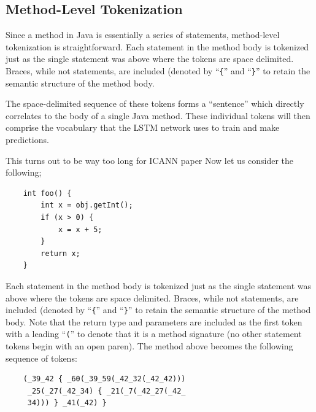 \documentclass[runningheads,a4paper]{llncs}
\begin{document}
\subsection{Method-Level Tokenization}

Since a method in Java is essentially a series of statements, method-level
tokenization is straightforward.
Each statement in the method body is tokenized just as the single statement 
was above where the tokens are space delimited. Braces, while not 
statements, are included (denoted by ``\texttt\{'' and
``\texttt\}''  to retain the semantic structure of the method body. 

The space-delimited sequence of these tokens forms a ``sentence'' which  
directly  correlates to the body of a single Java method. These individual  
tokens will then comprise the vocabulary that the LSTM network uses to train 
and make predictions.

\iffalse This turns out to be way too long for ICANN paper
Now let us consider the following;

\begin{verbatim}
    int foo() {
        int x = obj.getInt();
        if (x > 0) {
            x = x + 5;
        }
        return x;
    }
\end{verbatim}

Each statement in the method body is tokenized just as the single statement 
was above where the tokens are space delimited. Braces, while not 
statements, are included (denoted by ``\texttt\{'' and
``\texttt\}''  to retain the semantic structure of the method body. 
Note that the return type and parameters are included as the first 
token with a leading ``\texttt('' to denote that it is a method
signature (no other statement tokens begin with an open paren).
The method above becomes the following sequence of tokens:

\begin{verbatim}
    (_39_42 { _60(_39_59(_42_32(_42_42)))
     _25(_27(_42_34) { _21(_7(_42_27(_42_
     34))) } _41(_42) } 
\end{verbatim}
\end{document}
